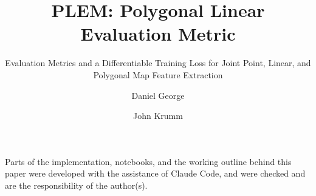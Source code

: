 \documentclass[sigconf]{acmart}
\makeatletter
\DeclareRobustCommand{\_}{%
  \ifmmode\nfss@text{\textunderscore}\else\textunderscore\allowbreak\fi}
\makeatother
\begin{document}
\title{PLEM: Polygonal Linear Evaluation Metric}
\subtitle{Evaluation Metrics and a Differentiable Training Loss for Joint Point, Linear, and Polygonal Map Feature Extraction}

\author{Daniel George}

\author{John Krumm}



\maketitle














\begin{acks}
Parts of the implementation, notebooks, and the working outline behind this paper were developed
with the assistance of Claude Code, and were checked and are the responsibility of the author(s).
\end{acks}



\appendix


\end{document}
